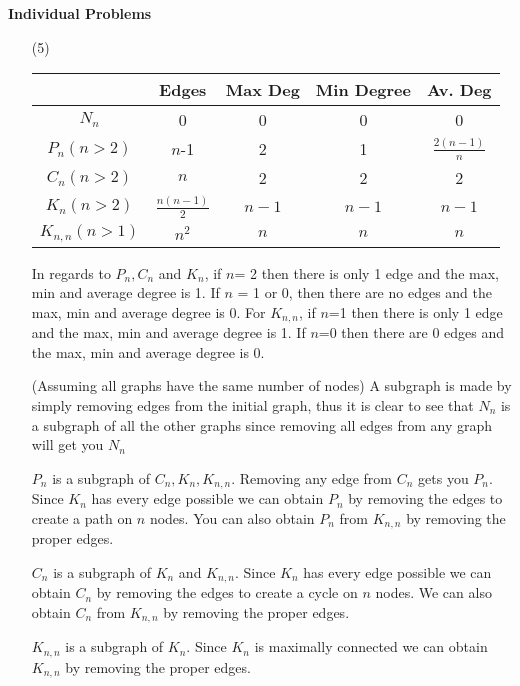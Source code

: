 \documentclass[11pt]{amsart}
\begin{document}
\noindent \textbf{Individual Problems}
\begin{enumerate}

\item[(5)]  

{

\begin{center}
 \begin{tabular}{||c | c | c | c | c||} 
 \hline
   & Edges & Max Deg & Min Degree & Av. Deg  \\ [0.5ex] 
 \hline\hline
 $N_n$ & 0 & 0 & 0 & 0 \\ 
 \hline
 $P_n (n>2)$ & $n$-1 & 2 & 1 & $\frac{2(n-1)}{n}$ \\
 \hline
 $C_n (n>2)$ & $n$ & 2 & 2 & 2 \\
 \hline
 $K_n (n>2)$ & $\frac{n(n-1)}{2}$ & $n-1$ & $n-1$ & $n-1$\\
 \hline
 $K_{n,n} (n>1)$& $n^2$ & $n$ & $n$ & $n$ \\ [1ex] 
 \hline
\end{tabular}
\end{center}

In regards to $P_n, C_n$ and $K_n$, if $n$= 2 then there is only 1 edge and the max, min and average degree is 1. If $n$ = 1 or 0, then there are no edges and the max, min and average degree is 0. For $K_{n,n}$, if $n$=1 then there is only 1 edge and the max, min and average degree is 1. If $n$=0 then there are 0 edges and the max, min and average degree is 0. \newline

(Assuming all graphs have the same number of nodes) A subgraph is made by simply removing edges from the initial graph,  thus it is clear to see that $N_n$ is a subgraph of all the other graphs since removing all edges from any graph will get you $N_n$

$P_n$ is  a subgraph of $C_n, K_n, K_{n,n}$.  Removing any edge from $C_n$ gets you $P_n$.  Since $K_n$ has every edge possible we can obtain $P_n$ by removing the edges to create a path on $n$ nodes.  You can also obtain $P_n$ from $K_{n,n}$  by removing the proper edges.

$C_n$ is a subgraph of $K_n$ and $K_{n,n}$. Since $K_n$ has every edge possible we can obtain $C_n$ by removing the edges to create a cycle on $n$ nodes.  We can also obtain $C_n$ from $K_{n,n}$ by removing the proper edges.

$K_{n,n}$ is a subgraph of $K_n$. Since $K_n$ is maximally connected we can obtain $K_{n,n}$ by removing the proper edges.

}
\end{enumerate}
\end{document}
